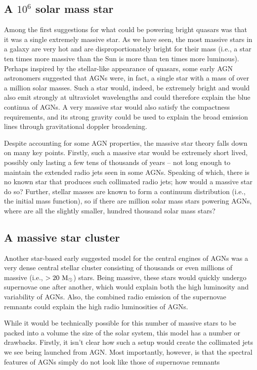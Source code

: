 \documentclass[11pt]{article}
\begin{document}
\subsection{A $10^6$ solar mass star}
Among the first suggestions for what could be powering bright quasars
was that it was a single extremely massive star. As we have seen, the
most massive stars in a galaxy are very hot and are disproportionately
bright for their mass (i.e., a star ten times more massive than the Sun is
more than ten times more luminous). Perhaps inspired by the
stellar-like appearance of quasars, some early AGN astronomers
suggested that AGNs were, in fact, a single star with a mass of over a
million solar masses. Such a star would, indeed, be extremely bright
and would also emit strongly at ultraviolet wavelengths and could
therefore explain the blue continua of AGNs. A very massive star would
also satisfy the compactness requirements, and its strong gravity
could be used to explain the broad emission lines through
gravitational doppler broadening.

Despite accounting for some AGN properties, the massive star theory
falls down on many key points. Firstly, such a massive star would be
extremely short lived, possibly only lasting a few tens of thousands
of years -- not long enough to maintain the extended radio jets seen
in some AGNs. Speaking of which, there is no known star that produces
such collimated radio jets; how would a massive star do so? Further,
stellar masses are known to form a continuum distribution (i.e., the
initial mass function), so if there are million solar mass stars
powering AGNs, where are all the slightly smaller, hundred thousand
solar mass stars?

\subsection{A massive star cluster}
Another star-based early suggested model for the central engines of AGNs was a
very dense central stellar cluster consisting of thousands or even
millions of massive (i.e., $>20~{\rm M_\odot}$) stars. Being massive,
these stars would quickly undergo supernovae one after another, which
would explain both the high luminosity and variability of AGNs. Also,
the combined radio emission of the supernovae remnants could explain
the high radio luminosities of AGNs.

While it would be technically possible for this number of massive
stars to be packed into a volume the size of the solar system, this
model has a number or drawbacks. Firstly, it isn't clear how such a
setup would create the collimated jets we see being launched from
AGN. Most importantly, however, is that the spectral features of AGNs
simply do not look like those of supernovae remnants
\end{document}
